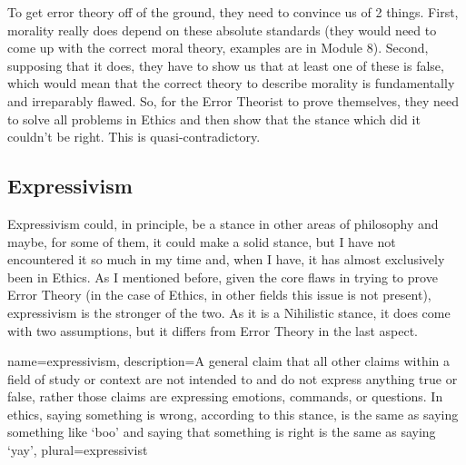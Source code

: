To get error theory off of the ground, they need to convince us of 2 things. First, morality really does depend on these absolute standards (they would need to come up with the correct moral theory, examples are in Module 8). Second, supposing that it does, they have to show us that at least one of these is false, which would mean that the correct theory to describe morality is fundamentally and irreparably flawed. So, for the Error Theorist to prove themselves, they need to solve all problems in Ethics and then show that the stance which did it couldn't be right. This is quasi-contradictory.

\subsection{Expressivism}

Expressivism could, in principle, be a stance in other areas of philosophy and maybe, for some of them, it could make a solid stance, but I have not encountered it so much in my time and, when I have, it has almost exclusively been in Ethics. As I mentioned before, given the core flaws in trying to prove Error Theory (in the case of Ethics, in other fields this issue is not present), 
\Gls{expressivism} is the stronger of the two. As it is a Nihilistic stance, it does come with two assumptions, but it differs from Error Theory in the last aspect.

{
  name=expressivism,
  description={A general claim that all other claims within a field of study or context are not intended to and do not express anything true or false, rather those claims are expressing emotions, commands, or questions. In ethics, saying something is wrong, according to this stance, is the same as saying something like `boo' and saying that something is right is the same as saying `yay'},
plural=expressivist
}


